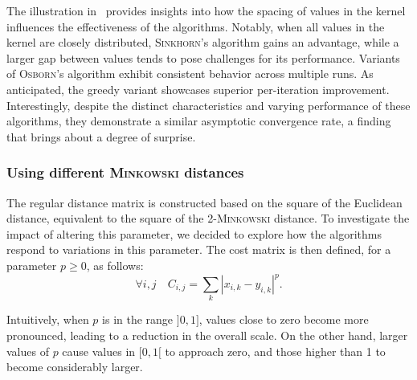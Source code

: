 The illustration in~ provides insights into how the spacing of values in the kernel influences the effectiveness of the algorithms. Notably, when all values in the kernel are closely distributed, \textsc{Sinkhorn}'s algorithm gains an advantage, while a larger gap between values tends to pose challenges for its performance. Variants of \textsc{Osborn}'s algorithm exhibit consistent behavior across multiple runs. As anticipated, the greedy variant showcases superior per-iteration improvement. Interestingly, despite the distinct characteristics and varying performance of these algorithms, they demonstrate a similar asymptotic convergence rate, a finding that brings about a degree of surprise.

\subsubsection{Using different \textsc{Minkowski} distances}\label{minkow}

The regular distance matrix is constructed based on the square of the Euclidean distance, equivalent to the square of the 2-\textsc{Minkowski} distance. To investigate the impact of altering this parameter, we decided to explore how the algorithms respond to variations in this parameter. The cost matrix is then defined, for a parameter \(p \geq 0\), as follows:
\[
    \forall i,j \quad C_{i,j} = \sum_{k} \left|x_{i,k} - y_{i,k}\right|^p.
\]

Intuitively, when \(p\) is in the range \(]0, 1]\), values close to zero become more pronounced, leading to a reduction in the overall scale. On the other hand, larger values of \(p\) cause values in \([0, 1[\) to approach zero, and those higher than 1 to become considerably larger. 

